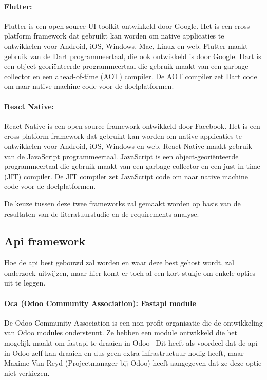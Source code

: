 \paragraph{Flutter:}
Flutter is een open-source UI toolkit ontwikkeld door Google.
Het is een cross-platform framework dat gebruikt kan worden om native applicaties te ontwikkelen voor Android, iOS, Windows, Mac, Linux en web.
Flutter maakt gebruik van de Dart programmeertaal, die ook ontwikkeld is door Google.
Dart is een object-georiënteerde programmeertaal die gebruik maakt van een garbage collector en een ahead-of-time (AOT) compiler.
De AOT compiler zet Dart code om naar native machine code voor de doelplatformen.

\paragraph{React Native:}
React Native is een open-source framework ontwikkeld door Facebook.
Het is een cross-platform framework dat gebruikt kan worden om native applicaties te ontwikkelen voor Android, iOS, Windows en web.
React Native maakt gebruik van de JavaScript programmeertaal.
JavaScript is een object-georiënteerde programmeertaal die gebruik maakt van een garbage collector en een just-in-time (JIT) compiler.
De JIT compiler zet JavaScript code om naar native machine code voor de doelplatformen.

\bigskip

De keuze tussen deze twee frameworks zal gemaakt worden op basis van de resultaten van de literatuurstudie en de requirements analyse.


\subsection{Api framework}%
\label{subsec:api_framework}

Hoe de api best gebouwd zal worden en waar deze best gehost wordt, zal onderzoek uitwijzen, maar hier komt er toch al een kort stukje om enkele opties uit te leggen.

\paragraph*{Oca (Odoo Community Association): Fastapi module}
De Odoo Community Association is een non-profit organisatie die de ontwikkeling van Odoo modules ondersteunt.
Ze hebben een module ontwikkeld die het mogelijk maakt om fastapi te draaien in Odoo~\autocite{ocaRestFramework2023}
Dit heeft als voordeel dat de api in Odoo zelf kan draaien en dus geen extra infrastructuur nodig heeft, 
maar Maxime Van Reyd (Projectmanager bij Odoo) heeft aangegeven dat ze deze optie niet verkiezen.

